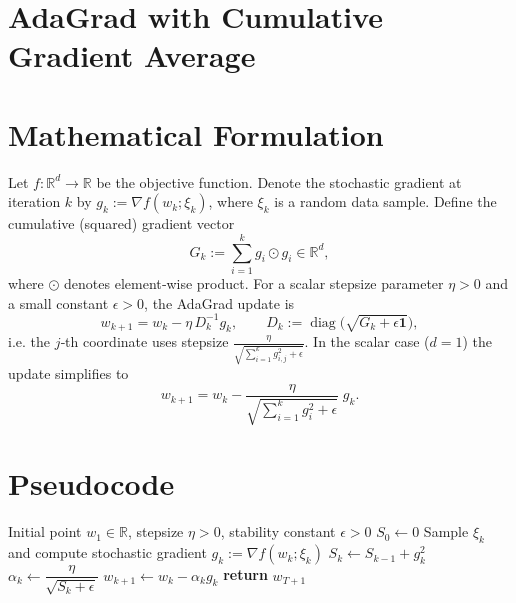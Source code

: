 \documentclass{article}
\newcommand{\R}{\mathbb{R}}
\begin{document}
\section*{AdaGrad with Cumulative Gradient Average}

\section*{Mathematical Formulation}
Let $f:\R^{d}\rightarrow\R$ be the objective function.
Denote the stochastic gradient at iteration $k$ by $g_{k}:=\nabla f(w_{k};\xi_{k})$, where $\xi_{k}$ is a random data sample.
Define the cumulative (squared) gradient vector
\[
G_{k}:=\sum_{i=1}^{k} g_{i}\odot g_{i}\in\R^{d},
\]
where $\odot$ denotes element‑wise product.  
For a scalar stepsize parameter $\eta>0$ and a small constant $\epsilon>0$, the AdaGrad update is
\begin{equation}
\label{eq:update}
w_{k+1}=w_{k}-\eta\,D_{k}^{-1}g_{k},\qquad 
D_{k}:=\operatorname{diag}\!\big(\sqrt{G_{k}+\epsilon\mathbf{1}}\big),
\end{equation}
i.e. the $j$‑th coordinate uses stepsize $\displaystyle\frac{\eta}{\sqrt{\sum_{i=1}^{k}g_{i,j}^{2}+\epsilon}}$.
In the scalar case ($d=1$) the update simplifies to
\begin{equation}
\label{eq:update_scalar}
w_{k+1}=w_{k}-\frac{\eta}{\sqrt{\sum_{i=1}^{k} g_{i}^{2}+\epsilon}}\;g_{k}.
\end{equation}

\section*{Pseudocode}
\begin{algorithm}[H]
\caption{AdaGrad (scalar version for clarity)}\label{alg:adagrad}
\begin{algorithmic}[1]
\Require Initial point $w_{1}\in\R$, stepsize $\eta>0$, stability constant $\epsilon>0$
\State $S_{0}\gets 0$ 
    \State Sample $\xi_{k}$ and compute stochastic gradient $g_{k}:=\nabla f(w_{k};\xi_{k})$
    \State $S_{k}\gets S_{k-1}+g_{k}^{2}$                         
    \State $\alpha_{k}\gets \dfrac{\eta}{\sqrt{S_{k}+\epsilon}}$ 
    \State $w_{k+1}\gets w_{k}-\alpha_{k}g_{k}$                 
\EndFor
\State \textbf{return} $w_{T+1}$
\end{algorithmic}
\end{algorithm}
\end{document}
